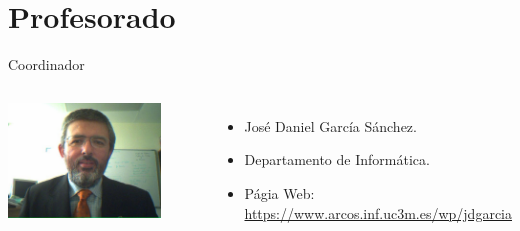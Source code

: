 \section{Profesorado}

\begin{frame}{Coordinador}
\begin{columns}


\includegraphics[width=0.8\textwidth]{images/prof/jdgarcia.jpg}


\begin{itemize}
\item José Daniel García Sánchez.
\item Departamento de Informática.
\item Págia Web: \url{https://www.arcos.inf.uc3m.es/wp/jdgarcia}
\end{itemize}

\end{columns}
\end{frame}

